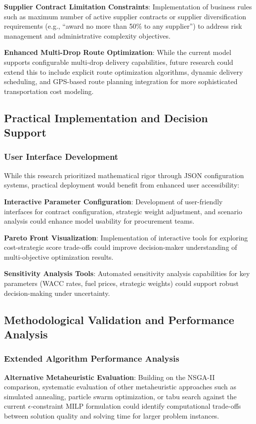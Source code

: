 \textbf{Supplier Contract Limitation Constraints}: Implementation of business rules such as maximum number of active supplier contracts or supplier diversification requirements (e.g., ``award no more than 50\% to any supplier'') to address risk management and administrative complexity objectives.

\textbf{Enhanced Multi-Drop Route Optimization}: While the current model supports configurable multi-drop delivery capabilities, future research could extend this to include explicit route optimization algorithms, dynamic delivery scheduling, and GPS-based route planning integration for more sophisticated transportation cost modeling.

\subsection{Practical Implementation and Decision Support}

\subsubsection{User Interface Development}
While this research prioritized mathematical rigor through JSON configuration systems, practical deployment would benefit from enhanced user accessibility:

\textbf{Interactive Parameter Configuration}: Development of user-friendly interfaces for contract configuration, strategic weight adjustment, and scenario analysis could enhance model usability for procurement teams.

\textbf{Pareto Front Visualization}: Implementation of interactive tools for exploring cost-strategic score trade-offs could improve decision-maker understanding of multi-objective optimization results.

\textbf{Sensitivity Analysis Tools}: Automated sensitivity analysis capabilities for key parameters (WACC rates, fuel prices, strategic weights) could support robust decision-making under uncertainty.

\iffalse

\subsection{Methodological Validation and Performance Analysis}

\subsubsection{Extended Algorithm Performance Analysis}
\textbf{Alternative Metaheuristic Evaluation}: Building on the NSGA-II comparison, systematic evaluation of other metaheuristic approaches such as simulated annealing, particle swarm optimization, or tabu search against the current $\epsilon$-constraint MILP formulation could identify computational trade-offs between solution quality and solving time for larger problem instances.

